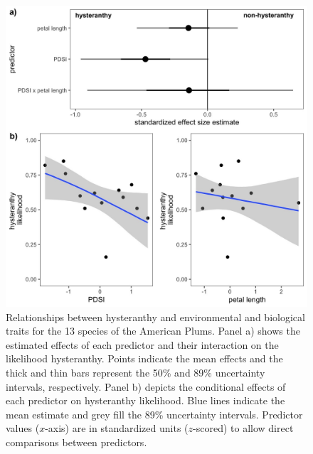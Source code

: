 \documentclass{article}[12pt]
\begin{document}
{{\begin{figure}[h!]
    \label{fig:ordinals}
\end{figure}


\begin{figure}[h!]
    \centering
 \includegraphics[width=\textwidth]{..//..//Plots/whatReviwerswant/hypoth_preds.jpeg}
    \caption{Relationships between hysteranthy and environmental and biological traits for the 13 species of the American Plums. Panel a) shows the estimated effects of each predictor and their interaction on the likelihood hysteranthy. Points indicate the mean effects and the thick and thin bars represent the 50\% and 89\% uncertainty intervals, respectively. Panel b) depicts the conditional effects of each predictor on hysteranthy likelihood. Blue lines indicate the mean estimate and grey fill the 89\% uncertainty intervals.  Predictor values ($x$-axis) are in standardized units ($z$-scored) to allow direct comparisons between predictors.}
    \label{fig:prunes}
\end{figure}



}}
\end{document}
